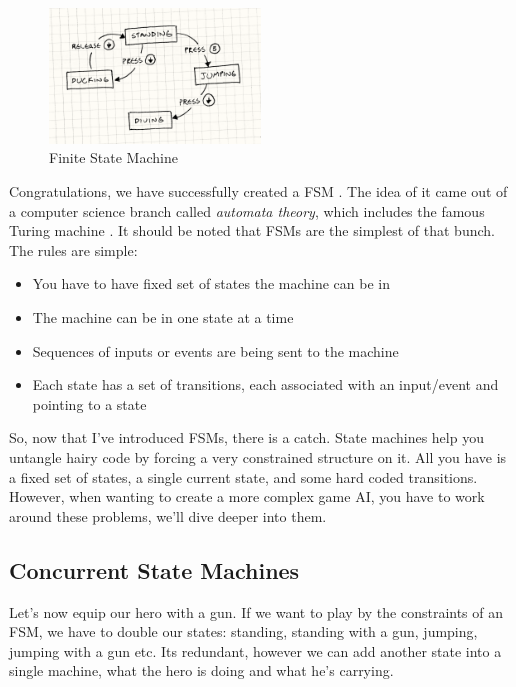 \documentclass[a4paper, 12pt]{book}
\begin{document}
\begin{figure}[h]
\begin{center}
\includegraphics[width=0.5\textwidth]{Images/state_FSM.png}
\end{center}
\caption{Finite State Machine}
\label{pic1}
\end{figure}

Congratulations, we have successfully created a FSM \cite{GameProgrammingPattersFMS}. The idea of it came out of a computer science branch called \emph{automata theory}, which includes the famous Turing machine \cite{TuringMachine}. It should be noted that FSMs are the simplest of that bunch. The rules are simple:
\begin{itemize}
    \item You have to have fixed set of states the machine can be in
    \item The machine can be in one state at a time
    \item Sequences of inputs or events are being sent to the machine
    \item Each state has a set of transitions, each associated  with an input/event and pointing to a state
\end{itemize}

So, now that I've introduced FSMs, there is a catch. State machines help you untangle hairy code by forcing a very constrained structure on it. All you have is a fixed set of states, a single current state, and some hard coded transitions. However, when wanting to create a more complex game AI, you have to work around these problems, we'll dive deeper into them. 

\subsection{Concurrent State Machines}

Let's now equip our hero with a gun. If we want to play by the constraints of an FSM, we have to double our states: standing, standing with a gun, jumping, jumping with a gun etc. Its redundant, however we can add another state into a single machine, what the hero is doing and what he's carrying.
\end{document}
